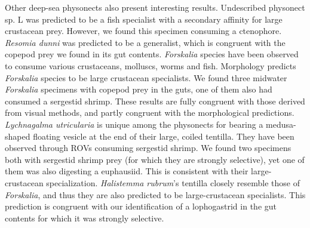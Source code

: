 \documentclass[12pt,]{article}
\begin{document}
Other deep-sea physonects also present interesting results. Undescribed physonect sp. L was predicted to be a fish specialist with a secondary affinity for large crustacean prey. However, we found this specimen consuming a ctenophore. \emph{Resomia dunni} was predicted to be a generalist, which is congruent with the copepod prey we found in its gut contents. \emph{Forskalia} species have been observed to consume various crustaceans, molluscs, worms and fish. Morphology predicts \emph{Forskalia} species to be large crustacean specialists. We found three midwater \emph{Forskalia} specimens with copepod prey in the guts, one of them also had consumed a sergestid shrimp. These results are fully congruent with those derived from visual methods, and partly congruent with the morphological predictions. \emph{Lychnagalma utricularia} is unique among the physonects for bearing a medusa-shaped floating vesicle at the end of their large, coiled tentilla. They have been observed through ROVs consuming sergestid shrimp. We found two specimens both with sergestid shrimp prey (for which they are strongly selective), yet one of them was also digesting a euphausiid. This is consistent with their large-crustacean specialization. \emph{Halistemma rubrum}'s tentilla closely resemble those of \emph{Forskalia}, and thus they are also predicted to be large-crustacean specialists. This prediction is congruent with our identification of a lophogastrid in the gut contents for which it was strongly selective.
\end{document}
